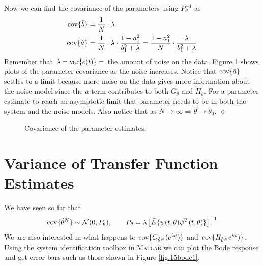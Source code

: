 \begin{example}
Now we can find the covariance of the parameters using $P_\theta^{-1}$ as
\begin{align*}
\text{cov}\{\hat{b}\} &= \frac{1}{N}\cdot\lambda \\
\text{cov}\{\hat{a}\} &= \frac{1}{N}\cdot\lambda\cdot\frac{1-a_1^2}{b_1^2+\lambda} = \frac{1-a_1^2}{N}\cdot\frac{\lambda}{b_1^2+\lambda}
\end{align*}
Remember that $\lambda = \text{var}\{e(t)\} = $ the amount of noise on the data. Figure \ref{fig:15cov} shows plots of the parameter covariance as the noise increases. Notice that $\text{cov}\{\hat{a}\}$ settles to a limit because more noise on the data gives more information about the noise model since the $a$ term contributes to both $G_\theta$ and $H_\theta$. For a parameter estimate to reach an asymptotic limit that parameter needs to be in both the system and the noise models. Also notice that as $N\to\infty \Rightarrow \hat{\theta}\to\theta_0$.
$\lozenge$
\end{example}

\begin{figure}[ht!]
	\centering
	 \hfill
	\caption{Covariance of the parameter estimates.}
	\label{fig:15cov}
\end{figure}

\section{Variance of Transfer Function Estimates}
We have seen so far that
$$\text{cov}\{\hat{\theta}^N\}\sim\mathcal{N}(0,P_\theta), \qquad P_\theta = \lambda\left[\bar{E}\{\psi(t,\theta)\psi^T(t,\theta)\}\right]^{-1}$$
We are also interested in what happens to $\text{cov}\{G_{\hat{\theta}^N}(e^{i\omega})\}$ and $\text{cov}\{H_{\hat{\theta}^N}e^{i\omega})\}$. Using the system identification toolbox in \textsc{Matlab} we can plot the Bode response and get error bars such as those shown in Figure \ref{fig:15bode1}.

